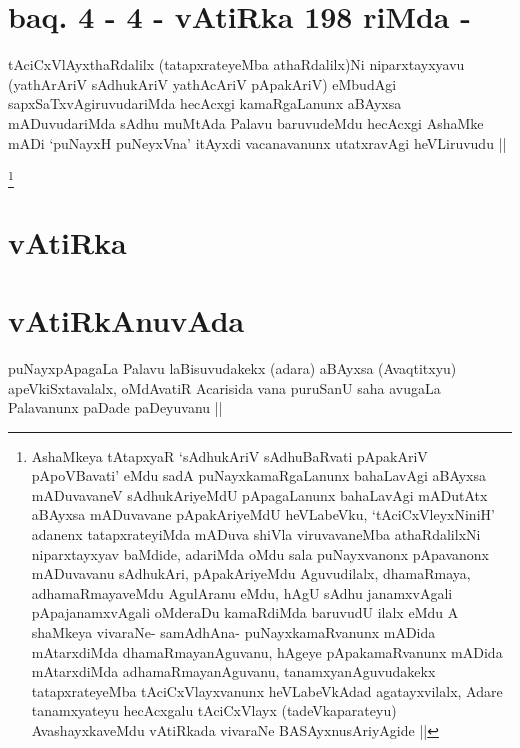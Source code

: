 
\section*{baq. 4 - 4 - vAtiRka 198 riMda -}


\begin{artha}
tAciCxVlAyxthaRdalilx (tatapxrateyeMba athaRdalilx)Ni niparxtayxyavu
(yathArAriV sAdhukAriV yathAcAriV pApakAriV) eMbudAgi
sapxSaTxvAgiruvudariMda hecAcxgi kamaRgaLanunx aBAyxsa mADuvudariMda
sAdhu muMtAda Palavu baruvudeMdu hecAcxgi AshaMke mADi `puNayxH
puNeyxVna' itAyxdi vacanavanunx utatxravAgi heVLiruvudu ||
\end{artha}


\footnote{AshaMkeya tAtapxyaR `sAdhukAriV sAdhuBaRvati pApakAriV
  pApoVBavati' eMdu sadA puNayxkamaRgaLanunx bahaLavAgi aBAyxsa
  mADuvavaneV sAdhukAriyeMdU pApagaLanunx bahaLavAgi mADutAtx aBAyxsa
  mADuvavane pApakAriyeMdU heVLabeVku, `tAciCxVleyxNiniH' adanenx
  tatapxrateyiMda mADuva shiVla viruvavaneMba athaRdalilxNi
  niparxtayxyav baMdide, adariMda oMdu sala puNayxvanonx pApavanonx
  mADuvavanu sAdhukAri, pApakAriyeMdu Aguvudilalx, dhamaRmaya,
  adhamaRmayaveMdu AgulAranu eMdu, hAgU sAdhu janamxvAgali
  pApajanamxvAgali oMderaDu kamaRdiMda baruvudU ilalx eMdu A shaMkeya
  vivaraNe- samAdhAna- puNayxkamaRvanunx mADida mAtarxdiMda
  dhamaRmayanAguvanu, hAgeye pApakamaRvanunx mADida mAtarxdiMda
  adhamaRmayanAguvanu, tanamxyanAguvudakekx tatapxrateyeMba
  tAciCxVlayxvanunx heVLabeVkAdad agatayxvilalx, Adare tanamxyateyu
  hecAcxgalu tAciCxVlayx (tadeVkaparateyu) AvashayxkaveMdu vAtiRkada
  vivaraNe BASAyxnusAriyAgide ||}\stext

\section*{vAtiRka}

\section{vAtiRkAnuvAda}

\begin{artha}
puNayxpApagaLa Palavu laBisuvudakekx (adara) aBAyxsa (Avaqtitxyu)
apeVkiSxtavalalx, oMdAvatiR Acarisida vana puruSanU saha avugaLa
Palavanunx paDade paDeyuvanu ||
\end{artha}


